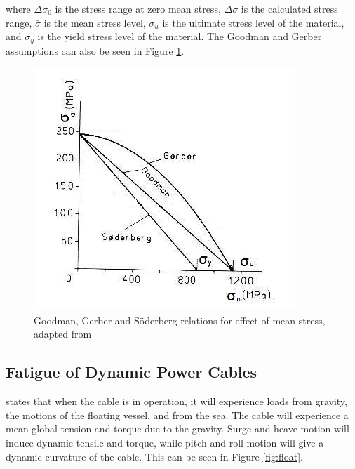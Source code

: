 \noindent where $\Delta \sigma_0$ is the stress range at zero mean stress, $\Delta \sigma$ is the calculated stress range, $\bar{\sigma}$ is the mean stress level, $\sigma_u$ is the ultimate stress level of the material, and $\sigma_y$ is the yield stress level of the material. The Goodman and Gerber assumptions can also be seen in Figure \ref{fig:gerber}. 

\begin{figure}[H]
\centering
\includegraphics[scale=0.8]{figures/soder.PNG}
\caption[$\; \:$Goodman, Gerber and Söderberg relations for effect of mean stress]{Goodman, Gerber and Söderberg relations for effect of mean stress, adapted from \cite{fatiguehand} }
 \label{fig:gerber}
\end{figure}

\subsection{Fatigue of Dynamic Power Cables}
\noindent \cite{Nasution2013} states that when the cable is in operation, it will experience loads from gravity, the motions of the floating vessel, and from the sea. The cable will experience a mean global tension and torque due to the gravity. Surge and heave motion will induce dynamic tensile and torque, while pitch and roll motion will give a dynamic curvature of the cable. This can be seen in Figure \ref{fig:float}. 

